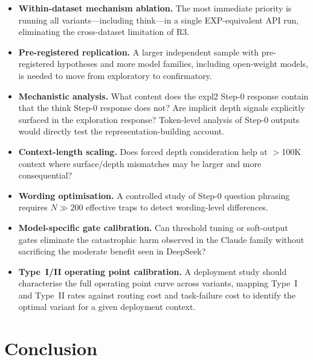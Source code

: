 \documentclass[11pt,a4paper]{article}
\begin{document}
\begin{itemize}[itemsep=2pt]
  \item \textbf{Within-dataset mechanism ablation.}  The most immediate
    priority is running all variants---including \textsf{think}---in a
    single EXP-equivalent API run, eliminating the cross-dataset
    limitation of R3.

  \item \textbf{Pre-registered replication.}  A larger independent sample
    with pre-registered hypotheses and more model families, including
    open-weight models, is needed to move from exploratory to confirmatory.

  \item \textbf{Mechanistic analysis.}  What content does the
    \textsf{expl2} Step-0 response contain that the \textsf{think}
    Step-0 response does not?  Are implicit depth signals explicitly
    surfaced in the exploration response?  Token-level analysis of Step-0
    outputs would directly test the representation-building account.

  \item \textbf{Context-length scaling.}  Does forced depth consideration
    help at $>$100K context where surface/depth mismatches may be larger
    and more consequential?

  \item \textbf{Wording optimisation.}  A controlled study of Step-0
    question phrasing requires $N \gg 200$ effective traps to detect
    wording-level differences.

  \item \textbf{Model-specific gate calibration.}  Can threshold tuning
    or soft-output gates eliminate the catastrophic harm observed in the
    Claude family without sacrificing the moderate benefit seen in DeepSeek?

  \item \textbf{Type~I/II operating point calibration.}  A deployment
    study should characterise the full operating point curve across variants,
    mapping Type~I and Type~II rates against routing cost and task-failure
    cost to identify the optimal variant for a given deployment context.
\end{itemize}

\section{Conclusion}
\label{sec:conclusion}
\end{document}
